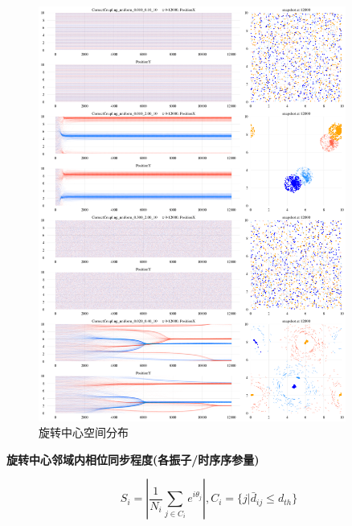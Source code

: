 \documentclass{article}
\begin{document}
\begin{figure}[H]
	\centering
	\includegraphics[width=0.9\textwidth]{./figs/totalXY.png}
	\caption{旋转中心空间分布}
	\label{fig:fig234t.1}
\end{figure}

\newpage
\noindent\textbf{旋转中心邻域内相位同步程度(各振子/时序序参量)}

$$S_{i}=\left|\frac{1}{N_{i}}\sum_{j\in C_{i}}e^{i\theta_{j}}\right|,C_{i}=\{j|\bar{d}_{ij}\leq d_{th}\}$$
\end{document}
